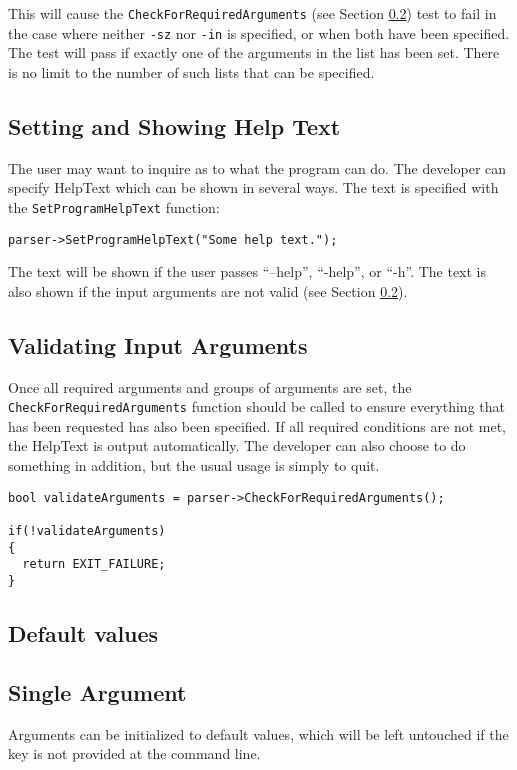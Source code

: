 \documentclass{InsightArticle}
\begin{document}
This will cause the \verb|CheckForRequiredArguments| (see Section \ref{subsec:ValidatingInputArguments}) test to fail in the case where neither \verb|-sz| nor \verb|-in| is specified, or when both have been specified. The test will pass if exactly one of the arguments in the list has been set. There is no limit to the number of such lists that can be specified.

\subsection{Setting and Showing Help Text}
The user may want to inquire as to what the program can do. The developer can specify HelpText which can be shown in several ways. The text is specified with the \verb|SetProgramHelpText| function:

\small
\begin{verbatim}
parser->SetProgramHelpText("Some help text.");
\end{verbatim}
\normalsize 

The text will be shown if the user passes ``--help'', ``-help'', or ``-h''. The text is also shown if the input arguments are not valid (see Section \ref{subsec:ValidatingInputArguments}).

\subsection{Validating Input Arguments}
\label{subsec:ValidatingInputArguments}
Once all required arguments and groups of arguments are set, the \verb|CheckForRequiredArguments| function should be called to ensure everything that has been requested has also been specified. If all required conditions are not met, the HelpText is output automatically. The developer can also choose to do something in addition, but the usual usage is simply to quit.

\small
\begin{verbatim}
bool validateArguments = parser->CheckForRequiredArguments();

if(!validateArguments)
{
  return EXIT_FAILURE;
}
\end{verbatim}
\normalsize 


\subsection{Default values}
\subsection{Single Argument}
Arguments can be initialized to default values, which will be left
untouched if the key is not provided at the command line. 
\end{document}
